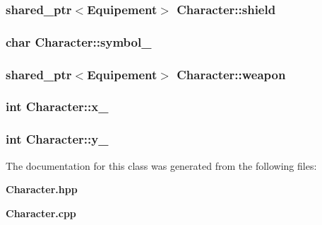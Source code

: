 \subsubsection[{shield}]{\setlength{\rightskip}{0pt plus 5cm}shared\-\_\-ptr$<${\bf Equipement}$>$ Character\-::shield\hspace{0.3cm}{\ttfamily [protected]}}\label{class_character_ac74a5ebc37ffa8dcc078c2530c0c947a}
\subsubsection[{symbol\-\_\-}]{\setlength{\rightskip}{0pt plus 5cm}char Character\-::symbol\-\_\-\hspace{0.3cm}{\ttfamily [protected]}}\label{class_character_af3b304ea19adc493b2daa9bd1e80229d}
\subsubsection[{weapon}]{\setlength{\rightskip}{0pt plus 5cm}shared\-\_\-ptr$<${\bf Equipement}$>$ Character\-::weapon\hspace{0.3cm}{\ttfamily [protected]}}\label{class_character_af779f72e2ccbc275350ab80b99136c7c}
\subsubsection[{x\-\_\-}]{\setlength{\rightskip}{0pt plus 5cm}int Character\-::x\-\_\-\hspace{0.3cm}{\ttfamily [protected]}}\label{class_character_af0ed42181b8730437905b21485879471}
\subsubsection[{y\-\_\-}]{\setlength{\rightskip}{0pt plus 5cm}int Character\-::y\-\_\-\hspace{0.3cm}{\ttfamily [protected]}}\label{class_character_aeda4757626cbc50f408dc93eb541a831}


The documentation for this class was generated from the following files\-:\begin{DoxyCompactItemize}
\item 
{\bf Character.\-hpp}\item 
{\bf Character.\-cpp}\end{DoxyCompactItemize}

